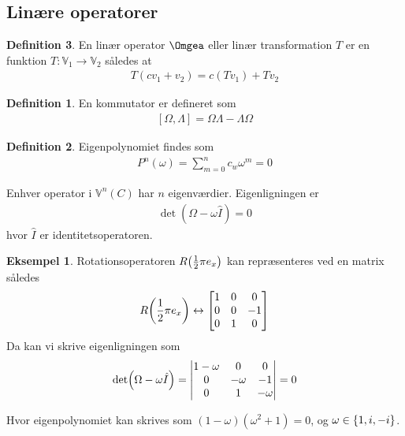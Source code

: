 \documentclass[12pt]{article}
\theoremstyle{definition}
\newtheorem{example}{Eksempel}[definition]
\theoremstyle{remark}
\theoremstyle{definition}
\newtheorem{definition}{Definition}[section]
\newcounter{theo}[section]\setcounter{theo}{0}
\numberwithin{equation}{section}
\begin{document}
\subsection{Linære operatorer}
\begin{definition}
En linær operator $\Omgea$ eller linær transformation $T$ er en funktion $T:\mathbb V_1 \to \mathbb V_2$ således at
\begin{align}
  \label{eq:2}
  T(cv_1+v_2) = c(Tv_1) + Tv_2
\end{align}

\begin{definition}
  En kommutator er defineret som
  \begin{align}
    \label{eq:com}
    [\Omega, \Lambda] = \Omega\Lambda - \Lambda \Omega
  \end{align}

\end{definition}

\begin{definition}
  Eigenpolynomiet findes som
  \begin{align}
    \label{eq:ei}
    P^n(\omega) = \sum_{m=0}^n c_w \omega^m = 0
  \end{align}
\end{definition}
Enhver operator i $\mathbb V^n(C)$ har $n$ eigenværdier. Eigenligningen er
\begin{align}
  \label{eq:kre}
  \det(\Omega-\omega \hat I) = 0
\end{align}
hvor $\hat I$ er identitetsoperatoren.

\begin{example}
  Rotationsoperatoren $R\qty(\frac{1}{2} \pi e_x)$ kan repræsenteres ved en matrix således
  \begin{align*}
    R\qty(\frac{1}{2} \pi e_x) \leftrightarrow \mqty[1&0&0\\0&0&-1\\0&1&0]
  \end{align*}
  Da kan vi skrive eigenligningen som
  \begin{align*}
    \det(\Omega-\omega \hat I) = \mqty|1-\omega &0&0\\0&-\omega&-1\\0&1&-\omega| = 0
  \end{align*}
\end{example}
Hvor eigenpolynomiet kan skrives som $(1-\omega)(\omega^2+1)=0$, og $\omega\in\qty{1,i,-i}$. 


\end{definition}
\newpage
\printbibliography
\end{document}
